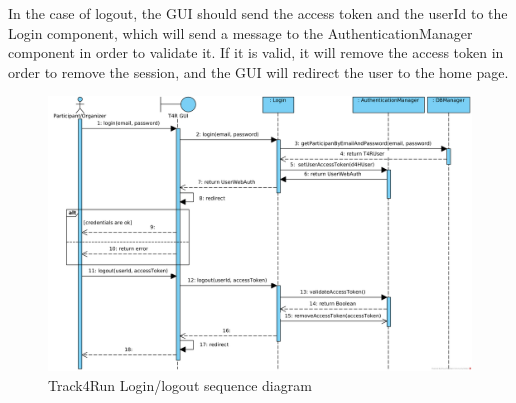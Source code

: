 \documentclass[a4paper, hidelinks, 12pt]{report}
\begin{document}
	In the case of logout, the GUI should send the access token and the userId to the Login component, which will send a message to the AuthenticationManager component in order to validate it. If it is valid, it will remove the access token in order to remove the session, and the GUI will redirect the user to the home page.\\ 
	\begin{figure}[H]
		\centering
		\includegraphics[width=1\textwidth]{diagrams/sequence_diagrams/t4r_login_logout.png}
		\caption[Track4Run Login/logout sequence diagram]{Track4Run Login/logout sequence diagram}
		\label{fig:t4r_seq_login}
	\end{figure}
	
\end{document}
